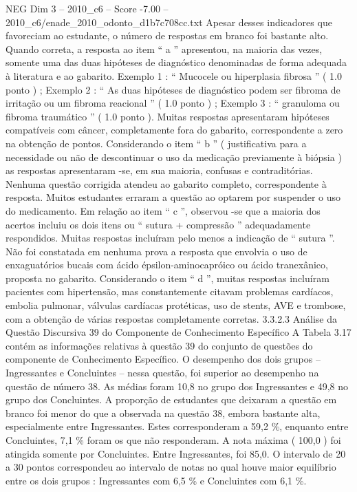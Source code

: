 \begin{textsample}{NEG Dim 3 – 2010\_c6 – Score -7.00 – 2010\_c6/enade\_2010\_odonto\_d1b7c708cc.txt}
Apesar desses indicadores que favoreciam ao estudante, o número de respostas em branco foi bastante alto.
Quando correta, a resposta ao item “ a ” apresentou, na maioria das vezes, somente uma das duas hipóteses de diagnóstico denominadas de forma adequada à literatura e ao gabarito.
Exemplo 1 : “ Mucocele ou hiperplasia fibrosa ” ( 1.0 ponto ) ; Exemplo 2 : “ As duas hipóteses de diagnóstico podem ser fibroma de irritação ou um fibroma reacional ” ( 1.0 ponto ) ; Exemplo 3 : “ granuloma ou fibroma traumático ” ( 1.0 ponto ).
Muitas respostas apresentaram hipóteses compatíveis com câncer, completamente fora do gabarito, correspondente a zero na obtenção de pontos.
Considerando o item “ b ” ( justificativa para a necessidade ou não de descontinuar o uso da medicação previamente à biópsia ) as respostas apresentaram -se, em sua maioria, confusas e contraditórias.
Nenhuma questão corrigida atendeu ao gabarito completo, correspondente à resposta.
Muitos estudantes erraram a questão ao optarem por suspender o uso do medicamento.
Em relação ao item “ c ”, observou -se que a maioria dos acertos incluiu os dois itens ou “ sutura + compressão ” adequadamente respondidos.
Muitas respostas incluíram pelo menos a indicação de “ sutura ”.
Não foi constatada em nenhuma prova a resposta que envolvia o uso de enxaguatórios bucais com ácido épsilon-aminocapróico ou ácido tranexânico, proposta no gabarito.
Considerando o item “ d ”, muitas respostas incluíram pacientes com hipertensão, mas constantemente citavam problemas cardíacos, embolia pulmonar, válvulas cardíacas protéticas, uso de stents, AVE e trombose, com a obtenção de várias respostas completamente corretas. 3.3.2.3 Análise da Questão Discursiva 39 do Componente de Conhecimento Específico A Tabela 3.17 contém as informações relativas à questão 39 do conjunto de questões do componente de Conhecimento Específico.
O desempenho dos dois grupos – Ingressantes e Concluintes – nessa questão, foi superior ao desempenho na questão de número 38.
As médias foram 10,8 no grupo dos Ingressantes e 49,8 no grupo dos Concluintes.
A proporção de estudantes que deixaram a questão em branco foi menor do que a observada na questão 38, embora bastante alta, especialmente entre Ingressantes.
Estes corresponderam a 59,2 \%, enquanto entre Concluintes, 7,1 \% foram os que não responderam.
A nota máxima ( 100,0 ) foi atingida somente por Concluintes.
Entre Ingressantes, foi 85,0.
O intervalo de 20 a 30 pontos correspondeu ao intervalo de notas no qual houve maior equilíbrio entre os dois grupos : Ingressantes com 6,5 \% e Concluintes com 6,1 \%.

\end{textsample}

